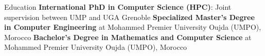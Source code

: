 
\begin{rubric}{Education}
\entry*[]%
    \textbf{International PhD in Computer Science (HPC)}: Joint supervision between UMP and UGA Grenoble
    \hfill {}
\entry*[]%
    \textbf{Specialized Master's Degree in Computer Engineering} at Mohammed Premier University Oujda (UMPO), Morocco
    \hfill {}
%
\entry*[]%
    \textbf{Bachelor's Degree in Mathematics and Computer Science} at Mohammed Premier University Oujda (UMPO), Morocco
        \hfill {}
%
%
\end{rubric}
